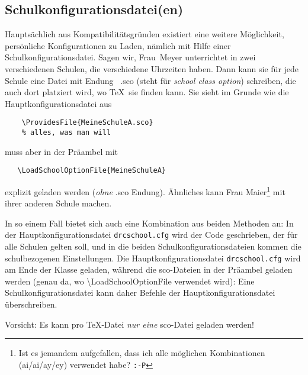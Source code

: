 \documentclass[hyperworksheet]{drcschool}
\newcommand*{\cs}[1]{\textup{\ttfamily\textbackslash#1}}                        %
\newcommand*{\opt}[1]{\textup{\ttfamily#1}}                                     %
\begin{document}
\subsection{Schulkonfigurationsdatei(en)}
Hauptsächlich aus Kompatibilitätsgründen existiert eine weitere Möglichkeit,
persönliche Konfigurationen zu Laden, nämlich mit Hilfe einer
Schulkonfigurationsdatei. Sagen wir, Frau~Meyer unterrichtet in zwei verschiedenen
Schulen, die verschiedene Uhrzeiten haben. Dann kann sie für jede Schule eine
Datei mit Endung ~\opt{.sco} (steht für \emph{school class option}) schreiben,
die auch dort platziert wird, wo \TeX\ sie finden kann. Sie sieht im Grunde
wie die Hauptkonfigurationsdatei aus
\begin{verbatim}
    \ProvidesFile{MeineSchuleA.sco}
    % alles, was man will
\end{verbatim}
muss aber in der Präambel mit
\begin{verbatim}
   \LoadSchoolOptionFile{MeineSchuleA}
\end{verbatim}
explizit geladen werden (\emph{ohne} \opt{.sco} Endung). Ähnliches
kann Frau Maier\footnote{Ist es jemandem aufgefallen, dass ich alle möglichen Kombinationen (ai/ai/ay/ey) verwendet habe? \texttt{:-P}}
mit ihrer anderen Schule machen.

In so einem Fall bietet sich auch eine Kombination aus beiden Methoden an:
In der Hauptkonfigurationsdatei \texttt{drcschool.cfg} wird der Code geschrieben,
der für
alle Schulen gelten soll, und in die beiden Schulkonfigurationsdateien
kommen die schulbezogenen
Einstellungen.
Die Hauptkonfigurationsdatei \texttt{drcschool.cfg}
wird am Ende der Klasse geladen, während die \opt{sco}-Dateien
in der Präambel geladen werden (genau da, wo \cs{LoadSchoolOptionFile} verwendet wird):
Eine Schulkonfigurationsdatei kann daher Befehle der Hauptkonfigurationsdatei
überschreiben.

Vorsicht: Es kann pro \TeX-Datei \emph{nur eine} \opt{sco}-Datei geladen werden!

\end{document}
